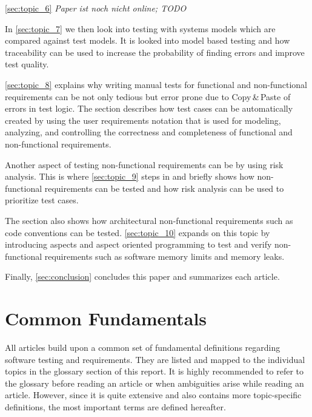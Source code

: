 \autoref{sec:topic_6} %
\textit{Paper ist noch nicht online; TODO}

In \autoref{sec:topic_7} %
we then look into testing with systems models which are compared against test models.
It is looked into model based testing and how traceability can be used to increase the probability of finding errors and improve test quality.

\autoref{sec:topic_8} %
explains why writing manual tests for functional and non-functional requirements can be  not only tedious but error prone due to Copy\,\&\,Paste of errors in test logic.
The section describes how test cases can be automatically created by using the user requirements notation that is used for modeling, analyzing, and controlling the correctness and completeness of functional and non-functional requirements.

Another aspect of testing non-functional requirements can be by using risk analysis.
This is where \autoref{sec:topic_9}%
steps in and briefly shows how non-functional requirements can be tested and how risk analysis can be used to prioritize test cases.

The section also shows how architectural non-functional requirements such as code conventions can be tested.
\autoref{sec:topic_10} %
expands on this topic by introducing aspects and aspect oriented programming to test and verify non-functional requirements such as software memory limits and memory leaks.

Finally, \autoref{sec:conclusion} concludes this paper and summarizes each article.

\section{Common Fundamentals}\label{sec:introduction_common_fundamentals}
All articles build upon a common set of fundamental definitions regarding software testing and requirements.
They are listed and mapped to the individual topics in the glossary section of this report.
It is highly recommended to refer to the glossary before reading an article or when ambiguities arise while reading an article.
However, since it is quite extensive and also contains more topic-specific definitions, the most important terms are defined hereafter.

